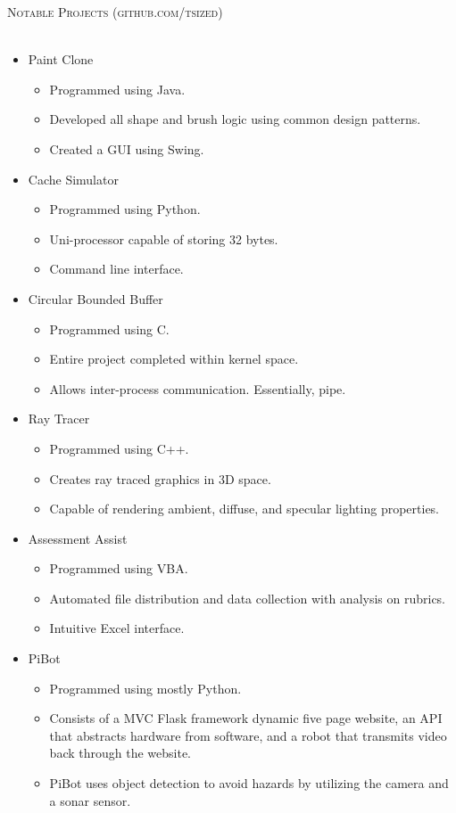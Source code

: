 \documentclass{article}
\newcommand{\lineunder}{\vspace*{-8pt} \\ \hspace*{-18pt} \hrulefill \\}
\newcommand{\header}[1]{{\hspace*{-15pt}\vspace*{6pt} \textsc{#1}} \vspace*{-6pt} \lineunder}
\begin{document}
\header{Notable Projects (github.com/tsized)}
    \begin{itemize}
    \item Paint Clone
        \begin{itemize}
        \item Programmed using Java.
        \item Developed all shape and brush logic using common design patterns.
        \item Created a GUI using Swing.
        \end{itemize}
	\item Cache Simulator
        \begin{itemize}
        \item Programmed using Python.
        \item Uni-processor capable of storing 32 bytes.
        \item Command line interface.
        \end{itemize}
	\item Circular Bounded Buffer
        \begin{itemize}
        \item Programmed using C.
        \item Entire project completed within kernel space.
        \item Allows inter-process communication. Essentially, pipe.
        \end{itemize}
	\item Ray Tracer
        \begin{itemize}
        \item Programmed using C++.
        \item Creates ray traced graphics in 3D space.
		\item Capable of rendering ambient, diffuse, and specular lighting properties.
        \end{itemize}
	\item Assessment Assist
		\begin{itemize}
		\item Programmed using VBA.
		\item Automated file distribution and data collection with analysis on
			rubrics.
		\item Intuitive Excel interface.
		\end{itemize}
	\item PiBot
		\begin{itemize}
		\item Programmed using mostly Python.
		\item Consists of a MVC Flask framework dynamic five page website, an API
              that abstracts hardware from software, and a robot that transmits
              video back through the website.
		\item PiBot uses object detection to avoid hazards by utilizing the camera
              and a sonar sensor.
		\end{itemize}
    \end{itemize}
\end{document}

